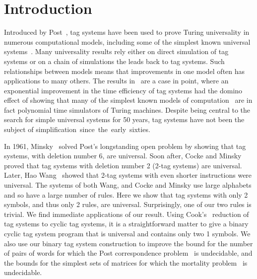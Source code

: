 \documentclass[11pt]{article} \usepackage{amsfonts,amsmath,amssymb,amsthm}
\begin{document}
\section{Introduction}
Introduced by Post~\cite{Post1943}, tag systems have been used to prove Turing universality in numerous computational models, including some of the simplest known universal systems~\cite{Baiocchi2001,Cook2004,HarjuMargenstern2005,Kudlek2002A,Minsky1962,Hooper1969,Robinson1971,Robinson1991,Rogozhin1996,Rothemund1996,SiegelmannMargenstern1999}. Many universality results rely either on direct simulation of tag systems or on a chain of simulations the leads back to tag systems. Such relationships between models means that improvements in one model often has applications to many others. The results in~\cite{WoodsNeary2006B} are a case in point, where an exponential improvement in the time efficiency of tag systems had the domino effect of showing that many of the simplest known models of computation~\cite{Baiocchi2001,Cook2004,HarjuMargenstern2005,Hooper1969,Kudlek2002A,LindgrenNordahl1990,Minsky1962,Robinson1971,Robinson1991,Rogozhin1996,Rothemund1996,SiegelmannMargenstern1999} are in fact polynomial time simulators of Turing machines. Despite being central to the search for simple universal systems for 50 years, tag systems have not been the subject of simplification~since~the~early~sixties. 

In 1961, Minsky~\cite{Minsky1961} solved Post's longstanding open problem by showing that tag systems, with deletion number 6, are universal.
Soon after, Cocke and Minsky~\cite{Cocke1964} proved that tag systems with deletion number 2 (2-tag systems) are universal. Later, Hao Wang~\cite{Wang1963} showed that 2-tag systems with even shorter instructions were universal. 
The systems of both Wang, and Cocke and Minsky use large alphabets and so have a large number of rules.
Here we show that tag systems with only 2 symbols, and thus only 2 rules, are universal. Surprisingly, one of our two rules is trivial. We find immediate applications of our result. Using Cook's~\cite{Cook2004} reduction of tag systems to cyclic tag systems,  it is a straightforward matter to give a binary cyclic tag system program that is universal and contains only two 1 symbols. We also use our binary tag system construction to improve the bound for the number of pairs of words for which the Post correspondence problem~\cite{Post1946} is undecidable, and the bounds for the simplest sets of matrices for which the mortality problem~\cite{Paterson1970} is undecidable.
\end{document}
